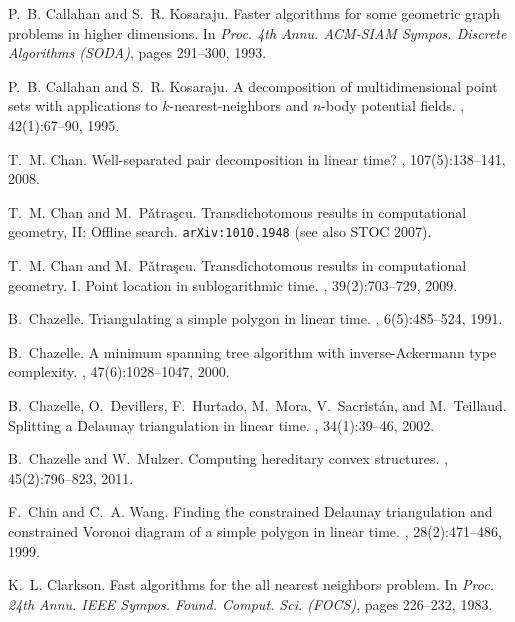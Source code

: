 \documentclass[11pt]{paper}
\begin{document}
\begin{thebibliography}{10}
P.~B. Callahan and S.~R. Kosaraju.
\newblock Faster algorithms for some geometric graph problems in higher
  dimensions.
\newblock In {\em Proc. 4th Annu. ACM-SIAM Sympos. Discrete Algorithms (SODA)},
  pages 291--300, 1993.

P.~B. Callahan and S.~R. Kosaraju.
\newblock A decomposition of multidimensional point sets with applications to
  {$k$}-nearest-neighbors and {$n$}-body potential fields.
, 42(1):67--90, 1995.

T.~M. Chan.
\newblock Well-separated pair decomposition in linear time?
, 107(5):138--141, 2008.

T.~M. Chan and M.~P{\v a}tra{\c s}cu.
\newblock Transdichotomous results in computational geometry, {II}: {O}ffline
  search.
\newblock \texttt{arXiv:1010.1948} (see also STOC 2007).

T.~M. Chan and M.~P{\v{a}}tra{\c{s}}cu.
\newblock Transdichotomous results in computational geometry. {I}. {P}oint
  location in sublogarithmic time.
, 39(2):703--729, 2009.

B.~Chazelle.
\newblock Triangulating a simple polygon in linear time.
, 6(5):485--524, 1991.

B.~Chazelle.
\newblock A minimum spanning tree algorithm with inverse-{A}ckermann type
  complexity.
, 47(6):1028--1047, 2000.

B.~Chazelle, O.~Devillers, F.~Hurtado, M.~Mora, V.~Sacrist{\'a}n, and
  M.~Teillaud.
\newblock Splitting a {D}elaunay triangulation in linear time.
, 34(1):39--46, 2002.

B.~Chazelle and W.~Mulzer.
\newblock Computing hereditary convex structures.
, 45(2):796--823, 2011.

F.~Chin and C.~A. Wang.
\newblock Finding the constrained {D}elaunay triangulation and constrained
  {V}oronoi diagram of a simple polygon in linear time.
, 28(2):471--486, 1999.

K.~L. Clarkson.
\newblock Fast algorithms for the all nearest neighbors problem.
\newblock In {\em Proc. 24th Annu. IEEE Sympos. Found. Comput. Sci. (FOCS)},
  pages 226--232, 1983.


\end{thebibliography}
\end{document}
